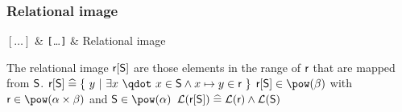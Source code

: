 \begin{samepage}
\subsubsection{Relational image}
\label{relational_image}
\begin{rrnames}
  $[\ldots]$  & \texttt{[}\ldots\texttt{]}  & Relational image
\end{rrnames}
\begin{rodinrefentry}
  \rrdesc
    The relational image $\textsf{r}[\textsf{S}]$ are those elements in the range of $\textsf{r}$
    that are mapped from $\textsf{S}$.
  \rrdef
    $\exprlr[\exprs] \defi \{~y~|~\exists x~\qdot~x\in \exprs\land x\mapsto y\in\exprlr~\}$
  \rrtypes
    $\exprlr[\exprs]\in\pow(\beta)$ with $\exprlr\in\pow(\alpha\cprod\beta)$ and $\exprs\in\pow(\alpha)$
  \rrwd
    $\mathcal{L}(\textsf{r}[\textsf{S}])\mathrel{\widehat=}\mathcal{L}(\textsf{r})\land\mathcal{L}(\textsf{S})$
\end{rodinrefentry}
\end{samepage}

